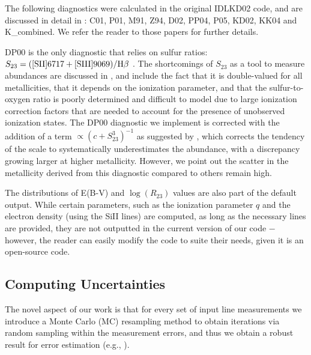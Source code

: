 \documentclass{emulateapj}
\begin{document}
The following diagnostics were calculated in the original IDLKD02 code, and are discussed in detail in \citet{kewley02,kewley08}: C01, P01, M91, Z94, D02, PP04, P05, KD02, KK04 and K\_combined. We refer the reader to those papers for further details.

DP00 is the only diagnostic that relies on sulfur ratios: $ S_{23}= {\rm ( [SII]6717+[SIII]9069) } / {\rm H}\beta $ . The shortcomings of $S_{23}$ as a tool to measure abundances are discussed in \citet{kewley02}, and include the fact that it is double-valued for all metallicities, that it depends on the ionization parameter, and that the sulfur-to-oxygen ratio is poorly determined and difficult to model due to large ionization correction factors that are needed to account for the presence of unobserved ionization states. The DP00 diagnostic we implement is corrected with the addition of a term $\propto (c+S_{23}^3)^{-1}$ as suggested by \citet{kewley02}, which corrects the tendency of the scale to systematically underestimates the abundance, with a discrepancy growing larger at higher metallicity. However, we point out the scatter in the metallicity derived from this diagnostic compared to others remain high. 


The distributions of E(B-V) and $\log(R_{23})$ values are also part of the default output. While certain parameters, such as the ionization parameter $q$ and the electron density (using the SiII lines) are computed, as long as the necessary lines are provided, they are not outputted in the current version of our code $-$ however, the reader can easily modify the code to suite their needs, given it is an open-source code.



\subsection{Computing Uncertainties}
The novel aspect of our work is that for every set of input line measurements we introduce a Monte Carlo (MC) resampling method to obtain iterations via random sampling within the measurement errors, and thus we obtain a robust result for error estimation (e.g., \citealt{efron79,hastie09,andrae10}). 
\end{document}
